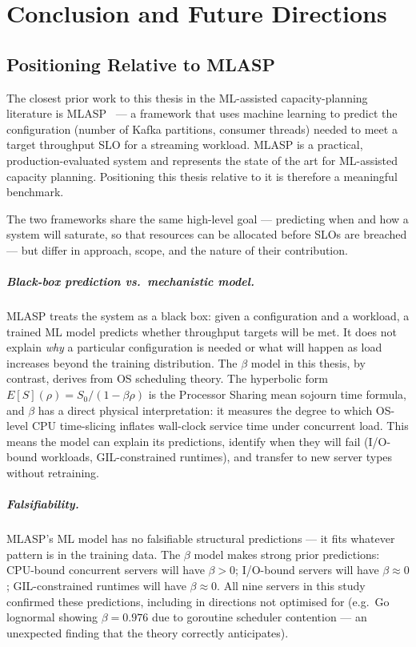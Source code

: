 \chapter{Conclusion and Future Directions}
\label{ch:conclusion_b}

\section{Positioning Relative to MLASP}
\label{sec:mlasp-comparison}

The closest prior work to this thesis in the ML-assisted capacity-planning literature is MLASP~\cite{VituiChen2021} — a framework that uses machine learning to predict the configuration (number of Kafka partitions, consumer threads) needed to meet a target throughput SLO for a streaming workload. MLASP is a practical, production-evaluated system and represents the state of the art for ML-assisted capacity planning. Positioning this thesis relative to it is therefore a meaningful benchmark.

The two frameworks share the same high-level goal — predicting when and how a system will saturate, so that resources can be allocated before SLOs are breached — but differ in approach, scope, and the nature of their contribution.

\paragraph{Black-box prediction vs.\ mechanistic model.}
MLASP treats the system as a black box: given a configuration and a workload, a trained ML model predicts whether throughput targets will be met. It does not explain \emph{why} a particular configuration is needed or what will happen as load increases beyond the training distribution. The $\beta$ model in this thesis, by contrast, derives from OS scheduling theory. The hyperbolic form $E[S](\rho) = S_0 / (1 - \beta\rho)$ is the Processor Sharing mean sojourn time formula, and $\beta$ has a direct physical interpretation: it measures the degree to which OS-level CPU time-slicing inflates wall-clock service time under concurrent load. This means the model can explain its predictions, identify when they will fail (I/O-bound workloads, GIL-constrained runtimes), and transfer to new server types without retraining.

\paragraph{Falsifiability.}
MLASP's ML model has no falsifiable structural predictions — it fits whatever pattern is in the training data. The $\beta$ model makes strong prior predictions: CPU-bound concurrent servers will have $\beta > 0$; I/O-bound servers will have $\beta \approx 0$; GIL-constrained runtimes will have $\beta \approx 0$. All nine servers in this study confirmed these predictions, including in directions not optimised for (e.g.\ Go lognormal showing $\beta = 0.976$ due to goroutine scheduler contention — an unexpected finding that the theory correctly anticipates).

